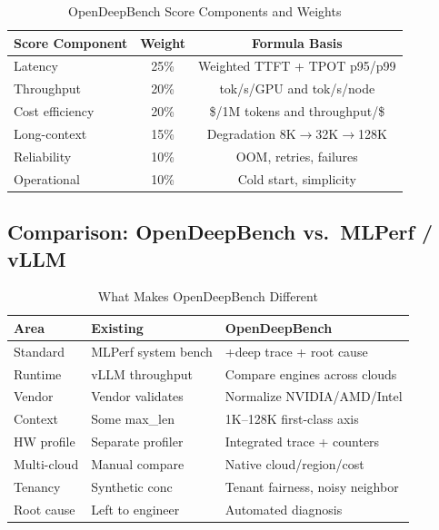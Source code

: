 \documentclass[conference,10pt]{IEEEtran}
\begin{document}
\begin{table}[!htbp]
\caption{OpenDeepBench Score Components and Weights}
\label{tab:weights}
\centering\footnotesize
\begin{tabular}{@{}lcc@{}}
\toprule
\textbf{Score Component} & \textbf{Weight} & \textbf{Formula Basis} \\
\midrule
Latency & 25\% & Weighted TTFT + TPOT p95/p99 \\
Throughput & 20\% & tok/s/GPU and tok/s/node \\
Cost efficiency & 20\% & \$/1M tokens and throughput/\$ \\
Long-context & 15\% & Degradation 8K$\to$32K$\to$128K \\
Reliability & 10\% & OOM, retries, failures \\
Operational & 10\% & Cold start, simplicity \\
\bottomrule
\end{tabular}
\end{table}

\subsection{Comparison: OpenDeepBench vs.\ MLPerf / vLLM}

\begin{table}[!htbp]
\caption{What Makes OpenDeepBench Different}
\label{tab:comparison}
\centering\footnotesize
\begin{tabular}{@{}lp{1.8cm}p{2.8cm}@{}}
\toprule
\textbf{Area} & \textbf{Existing} & \textbf{OpenDeepBench} \\
\midrule
Standard & MLPerf system bench & +deep trace + root cause \\
Runtime & vLLM throughput & Compare engines across clouds \\
Vendor & Vendor validates & Normalize NVIDIA/AMD/Intel \\
Context & Some max\_len & 1K--128K first-class axis \\
HW profile & Separate profiler & Integrated trace + counters \\
Multi-cloud & Manual compare & Native cloud/region/cost \\
Tenancy & Synthetic conc & Tenant fairness, noisy neighbor \\
Root cause & Left to engineer & Automated diagnosis \\
\bottomrule
\end{tabular}
\end{table}
\end{document}
